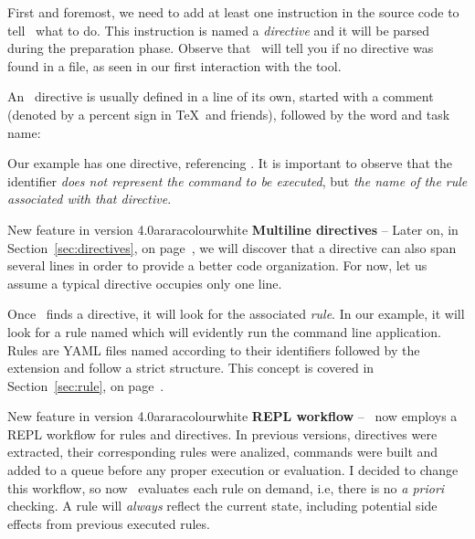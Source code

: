 First and foremost, we need to add at least one instruction in the source code to tell \arara\ what to do. This instruction is named a \emph{directive} and it will be parsed during the preparation phase. Observe that \arara\ will tell you if no directive was found in a file, as seen in our first interaction with the tool.

An \arara\ directive is usually defined in a line of its own, started with a comment (denoted by a percent sign in \TeX\ and friends), followed by the word  and task name:


Our example has one directive, referencing . It is important to observe that the  identifier \emph{does not represent the command to be executed}, but \emph{the name of the rule associated with that directive}.

\begin{messagebox}{New feature in version 4.0}{araracolour}{\icinfo}{white}
\textbf{Multiline directives} -- Later on, in Section~\ref{sec:directives}, on page~\pageref{sec:directives}, we will discover that a directive can also span several lines in order to provide a better code organization. For now, let us assume a typical directive occupies only one line.
\end{messagebox}

Once \arara\ finds a directive, it will look for the associated \emph{rule}. In our example, it will look for a rule named  which will evidently run the  command line application. Rules are \gls{YAML} files named according to their identifiers followed by the  extension and follow a strict structure. This concept is covered in Section~\ref{sec:rule}, on page~\pageref{sec:rule}.

\begin{messagebox}{New feature in version 4.0}{araracolour}{\icattention}{white}
\textbf{\gls{REPL} workflow} -- \arara\ now employs a \gls{REPL} workflow for rules and directives. In previous versions, directives were extracted, their corresponding rules were analized, commands were built and added to a queue before any proper execution or evaluation. I decided to change this workflow, so now \arara\ evaluates each rule on demand, i.e, there is no \emph{a priori} checking. A rule will \emph{always} reflect the current state, including potential side effects from previous executed rules.
\end{messagebox}


